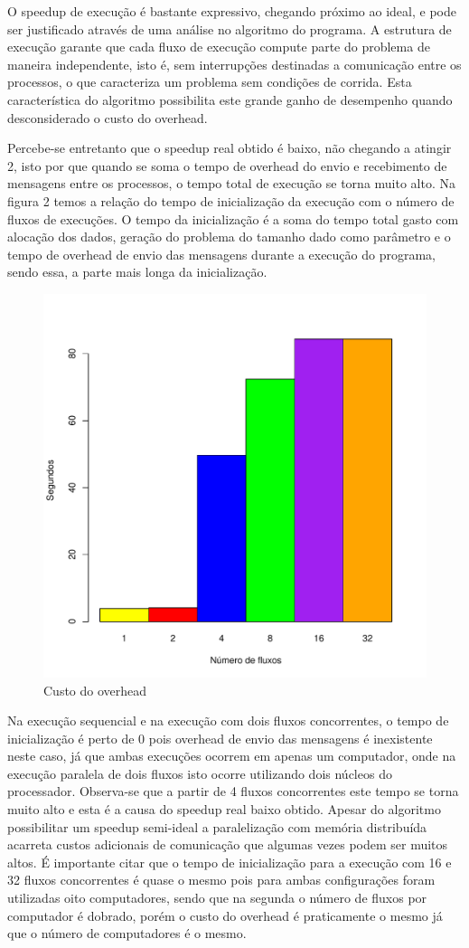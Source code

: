 \documentclass[12pt]{article}
\begin{document}
O speedup de execução é bastante expressivo, chegando próximo ao ideal, e pode ser justificado através de uma análise no algoritmo do programa. A estrutura de execução garante que cada fluxo de execução compute parte do problema de maneira independente, isto é, sem interrupções destinadas a comunicação entre os processos, o que caracteriza um problema sem condições de corrida. Esta característica do algoritmo possibilita este grande ganho de desempenho quando desconsiderado o custo do overhead.   

Percebe-se entretanto que o speedup real obtido é baixo, não chegando a atingir 2, isto por que quando se soma o tempo de overhead do envio e recebimento de mensagens entre os processos, o tempo total de execução se torna muito alto. Na figura 2 temos a relação do tempo de inicialização da execução com o número de fluxos de execuções. O tempo da inicialização é a soma do tempo total gasto com alocação dos dados, geração do problema do tamanho dado como parâmetro e o tempo de overhead de envio das mensagens durante a execução do programa, sendo essa, a parte mais longa da inicialização.

\begin{figure}[ht!]
\centering
\includegraphics[width=.5\textwidth]{msgs.pdf}
\caption{Custo do overhead}
\label{fig:custooverhead}
\end{figure}

Na execução sequencial e na execução com dois fluxos concorrentes, o tempo de inicialização é perto de 0 pois overhead de envio das mensagens é inexistente neste caso, já que ambas execuções ocorrem em apenas um computador, onde na execução paralela de dois fluxos isto ocorre utilizando dois núcleos do processador. Observa-se que a partir de 4 fluxos concorrentes este tempo se torna muito alto e esta é a causa do speedup real baixo obtido. Apesar do algoritmo possibilitar um speedup semi-ideal a paralelização com memória distribuída acarreta custos adicionais de comunicação que algumas vezes podem ser muitos altos. É importante citar que o tempo de inicialização para a execução com 16 e 32 fluxos concorrentes é quase o mesmo pois para ambas configurações foram utilizadas oito computadores, sendo que na segunda o número de fluxos por computador é dobrado, porém o custo do overhead é praticamente o mesmo já que o número de computadores é o mesmo.
\end{document}
